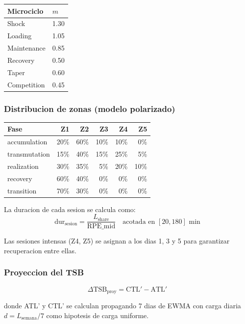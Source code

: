 \documentclass[12pt, a4paper]{article}
\begin{document}
\begin{center}
\begin{tabular}{ll}
\toprule
Microciclo & $m$ \\
\midrule
Shock       & 1.30 \\
Loading     & 1.05 \\
Maintenance & 0.85 \\
Recovery    & 0.50 \\
Taper       & 0.60 \\
Competition & 0.45 \\
\bottomrule
\end{tabular}
\end{center}

\subsubsection{Distribucion de zonas (modelo polarizado)}

\begin{longtable}{>{\ttfamily}p{3.5cm} rrrrr}
  \toprule
  Fase & Z1 & Z2 & Z3 & Z4 & Z5 \\
  \midrule
  \endhead
  accumulation   & 20\% & 60\% & 10\% & 10\% & 0\% \\
  transmutation  & 15\% & 40\% & 15\% & 25\% & 5\% \\
  realization    & 30\% & 35\% &  5\% & 20\% & 10\% \\
  recovery       & 60\% & 40\% &  0\% &  0\% & 0\% \\
  transition     & 70\% & 30\% &  0\% &  0\% & 0\% \\
  \bottomrule
\end{longtable}

La duracion de cada sesion se calcula como:
\[
  \text{dur}_{\text{sesion}} = \frac{L_{\text{share}}}{\text{RPE\_mid}}
  \quad \text{acotada en } [20, 180]\text{ min}
\]

Las sesiones intensas (Z4, Z5) se asignan a los dias 1, 3 y 5
para garantizar recuperacion entre ellas.

\subsubsection{Proyeccion del TSB}

\[
  \Delta\text{TSB}_{\text{proy}} = \text{CTL}' - \text{ATL}'
\]

donde ATL' y CTL' se calculan propagando 7 dias de EWMA con carga diaria
$d = L_{\text{semana}} / 7$ como hipotesis de carga uniforme.
\end{document}
